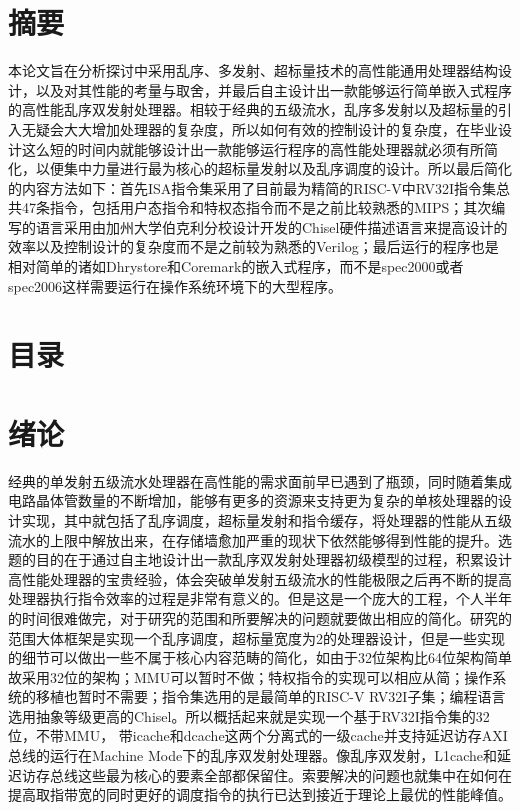 \documentclass[11pt]{article}
\begin{document}

\section{摘要}
本论文旨在分析探讨中采用乱序、多发射、超标量技术的高性能通用处理器结构设计，以及对其性能的考量与取舍，并最后自主设计出一款能够运行简单嵌入式程序的高性能乱序双发射处理器。相较于经典的五级流水，乱序多发射以及超标量的引入无疑会大大增加处理器的复杂度，所以如何有效的控制设计的复杂度，在毕业设计这么短的时间内就能够设计出一款能够运行程序的高性能处理器就必须有所简化，以便集中力量进行最为核心的超标量发射以及乱序调度的设计。所以最后简化的内容方法如下：首先ISA指令集采用了目前最为精简的RISC-V中RV32I指令集总共47条指令，包括用户态指令和特权态指令而不是之前比较熟悉的MIPS；其次编写的语言采用由加州大学伯克利分校设计开发的Chisel硬件描述语言来提高设计的效率以及控制设计的复杂度而不是之前较为熟悉的Verilog；最后运行的程序也是相对简单的诸如Dhrystore和Coremark的嵌入式程序，而不是spec2000或者spec2006这样需要运行在操作系统环境下的大型程序。


\section{目录}

\section{绪论}
经典的单发射五级流水处理器在高性能的需求面前早已遇到了瓶颈，同时随着集成电路晶体管数量的不断增加，能够有更多的资源来支持更为复杂的单核处理器的设计实现，其中就包括了乱序调度，超标量发射和指令缓存，将处理器的性能从五级流水的上限中解放出来，在存储墙愈加严重的现状下依然能够得到性能的提升。选题的目的在于通过自主地设计出一款乱序双发射处理器初级模型的过程，积累设计高性能处理器的宝贵经验，体会突破单发射五级流水的性能极限之后再不断的提高处理器执行指令效率的过程是非常有意义的。但是这是一个庞大的工程，个人半年的时间很难做完，对于研究的范围和所要解决的问题就要做出相应的简化。研究的范围大体框架是实现一个乱序调度，超标量宽度为2的处理器设计，但是一些实现的细节可以做出一些不属于核心内容范畴的简化，如由于32位架构比64位架构简单故采用32位的架构；MMU可以暂时不做；特权指令的实现可以相应从简；操作系统的移植也暂时不需要；指令集选用的是最简单的RISC-V RV32I子集；编程语言选用抽象等级更高的Chisel。所以概括起来就是实现一个基于RV32I指令集的32位，不带MMU，
带icache和dcache这两个分离式的一级cache并支持延迟访存AXI总线的运行在Machine Mode下的乱序双发射处理器。像乱序双发射，L1cache和延迟访存总线这些最为核心的要素全部都保留住。索要解决的问题也就集中在如何在提高取指带宽的同时更好的调度指令的执行已达到接近于理论上最优的性能峰值。
\end{document}
